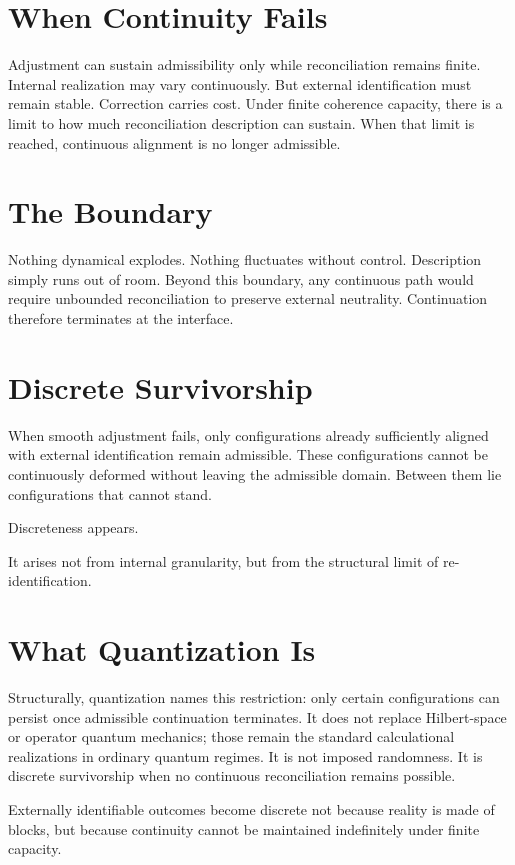 \documentclass[11pt,twoside,openright]{book}
\begin{document}
\section*{When Continuity Fails}

Adjustment can sustain admissibility only while reconciliation remains finite. Internal realization may vary continuously. But external identification must remain stable. Correction carries cost. Under finite coherence capacity, there is a limit to how much reconciliation description can sustain. When that limit is reached, continuous alignment is no longer admissible.

\section*{The Boundary}

Nothing dynamical explodes. Nothing fluctuates without control. Description simply runs out of room. Beyond this boundary, any continuous path would require unbounded reconciliation to preserve external neutrality. Continuation therefore terminates at the interface.

\section*{Discrete Survivorship}

When smooth adjustment fails, only configurations already sufficiently aligned with external identification remain admissible. These configurations cannot be continuously deformed without leaving the admissible domain. Between them lie configurations that cannot stand.

Discreteness appears.

It arises not from internal granularity, but from the structural limit of re-identification.

\section*{What Quantization Is}

Structurally, quantization names this restriction: only certain configurations can persist once admissible continuation terminates. It does not replace Hilbert-space or operator quantum mechanics; those remain the standard calculational realizations in ordinary quantum regimes. It is not imposed randomness. It is discrete survivorship when no continuous reconciliation remains possible.

Externally identifiable outcomes become discrete not because reality is made of blocks, but because continuity cannot be maintained indefinitely under finite capacity.
\end{document}
